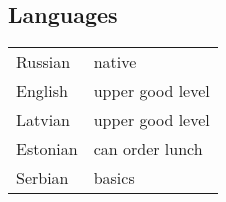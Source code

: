 \documentclass[10pt]{article}
\begin{document}
\begin{multicols*}{2}
\subsection*{Languages}
\begin{tabular}{ll}
    Russian & native \\
    English & upper good level \\
    Latvian & upper good level \\
    Estonian & can order lunch \\
    Serbian & basics \\
\end{tabular}
\end{multicols*}
\end{document}
